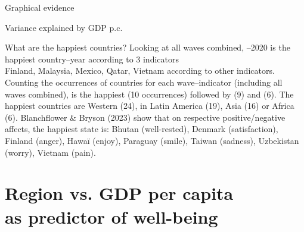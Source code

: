 \documentclass[aspectratio=169,xcolor=dvipsnames, 11pt,mathserif]{beamer}
\begin{document}
\begin{frame}{Graphical evidence}
\begin{figure}
\end{figure}
\end{frame}

\begin{frame}{Variance explained by GDP p.c.\label{gdp} \hyperlink{gdp_add}{}}
\end{frame}

\begin{frame}{What are the happiest countries?}
    \bbvsp
    \ip {}
    \ip Looking at all waves combined, --2020 is the happiest country--year according to 3 indicators\\Finland, Malaysia, Mexico, Qatar, Vietnam according to other indicators.
    \ip Counting the occurrences of countries for each wave--indicator (including all waves combined),  is the happiest (10 occurrences) followed by  (9) and  (6).
    \ip The happiest countries are Western (24), in Latin America (19), Asia (16) or Africa (6).
    \ip Blanchflower \& Bryson (2023) show that on respective positive/negative affects, the happiest state is: Bhutan (well-rested), Denmark (satisfaction), Finland (anger), Hawaï (enjoy), Paraguay (smile), Taiwan (sadness), Uzbekistan (worry), Vietnam (pain). %
    \ee
\end{frame}


\section{Region vs. GDP per capita\\as predictor of well-being}
\end{document}
